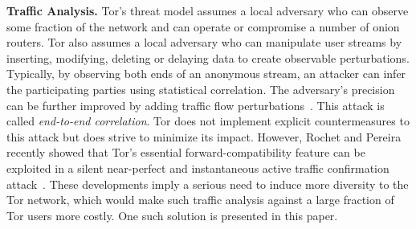 

\textbf{Traffic Analysis.}
Tor's threat model assumes a local adversary who can observe some fraction of
the network and can operate or compromise a number of onion routers. Tor also
assumes a local adversary who can manipulate user streams by inserting,
modifying, deleting or delaying data to create observable perturbations.
Typically, by observing both ends of an anonymous stream, an attacker can infer
the participating parties using statistical correlation. The adversary's
precision can be further improved by adding traffic flow
perturbations~\cite{fu2009one}. This attack is called \textit{end-to-end
  correlation}. Tor does not implement explicit countermeasures to this attack
but does strive to minimize its impact. However, Rochet and Pereira recently
showed that Tor's essential forward-compatibility feature can be exploited in a
silent near-perfect and instantaneous active traffic confirmation
attack~\cite{rochet2018dropping}. These developments imply a serious need to
induce more diversity to the Tor network, which would make such traffic analysis
against a large fraction of Tor users more costly. One such solution is
presented in this paper.

